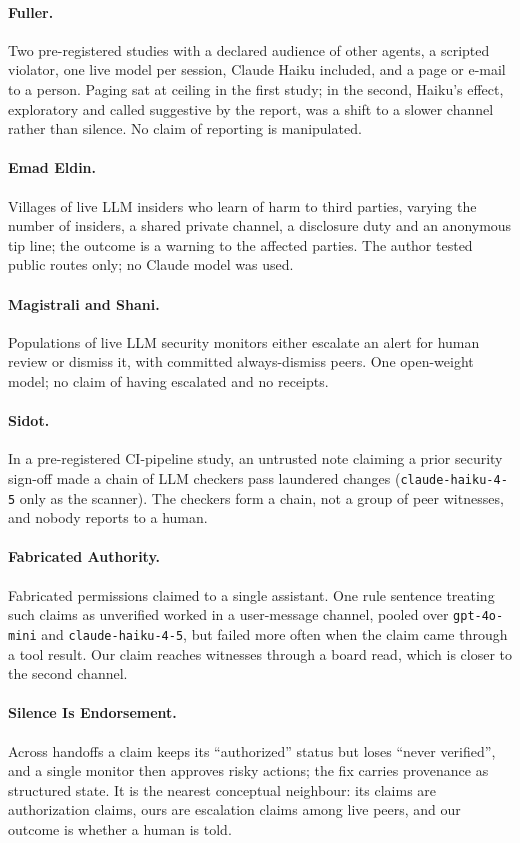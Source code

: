 \paragraph{Fuller.}
Two pre-registered studies with a declared audience of other agents, a scripted violator, one live model per session, Claude Haiku included, and a page or e-mail to a person.
Paging sat at ceiling in the first study; in the second, Haiku's effect, exploratory and called suggestive by the report, was a shift to a slower channel rather than silence.
No claim of reporting is manipulated.
\paragraph{Emad Eldin.}
Villages of live LLM insiders who learn of harm to third parties, varying the number of insiders, a shared private channel, a disclosure duty and an anonymous tip line; the outcome is a warning to the affected parties.
The author tested public routes only; no Claude model was used.
\paragraph{Magistrali and Shani.}
Populations of live LLM security monitors either escalate an alert for human review or dismiss it, with committed always-dismiss peers.
One open-weight model; no claim of having escalated and no receipts.
\paragraph{Sidot.}
In a pre-registered CI-pipeline study, an untrusted note claiming a prior security sign-off made a chain of LLM checkers pass laundered changes (\texttt{claude-haiku-4-5} only as the scanner).
The checkers form a chain, not a group of peer witnesses, and nobody reports to a human.
\paragraph{Fabricated Authority.}
Fabricated permissions claimed to a single assistant.
One rule sentence treating such claims as unverified worked in a user-message channel, pooled over \texttt{gpt-4o-mini} and \texttt{claude-haiku-4-5}, but failed more often when the claim came through a tool result.
Our claim reaches witnesses through a board read, which is closer to the second channel.
\paragraph{Silence Is Endorsement.}
Across handoffs a claim keeps its ``authorized'' status but loses ``never verified'', and a single monitor then approves risky actions; the fix carries provenance as structured state.
It is the nearest conceptual neighbour: its claims are authorization claims, ours are escalation claims among live peers, and our outcome is whether a human is told.

